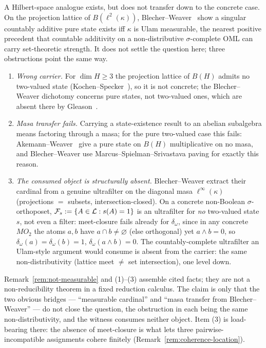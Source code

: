 A Hilbert-space analogue exists, but does not transfer down to the concrete case.
On the projection lattice of $B(\ell^2(\kappa))$, Blecher--Weaver~\cite{BlecherWeaver2017}
show a singular countably additive pure state exists iff $\kappa$ is Ulam
measurable, the nearest positive precedent that countable additivity on a
non-distributive $\sigma$-complete OML can carry set-theoretic strength. It does
not settle the question here; three obstructions point the same way.
\begin{enumerate}[label=\textup{(\arabic*)}]
  \item \emph{Wrong carrier.} For $\dim H\geq 3$ the projection lattice of $B(H)$
    admits no two-valued state (Kochen--Specker~\cite{KochenSpecker1967}), so it
    is not concrete; the Blecher--Weaver dichotomy concerns pure states, not
    two-valued ones, which are absent there by Gleason~\cite{Gleason1957}.
  \item \emph{Masa transfer fails.} Carrying a state-existence result to an
    abelian subalgebra means factoring through a masa; for the pure two-valued
    case this fails: Akemann--Weaver~\cite{AkemannWeaver2008} give a pure state
    on $B(H)$ multiplicative on no masa, and Blecher--Weaver use
    Marcus--Spielman--Srivastava paving for exactly this reason.
  \item \emph{The consumed object is structurally absent.} Blecher--Weaver
    extract their cardinal from a genuine ultrafilter on the diagonal masa
    $\ell^\infty(\kappa)$ (projections $=$ subsets, intersection-closed). On a
    concrete non-Boolean $\sigma$-orthoposet,
    $\mathcal F_s := \{A\in\mathcal{L} : s(A)=1\}$ is an ultrafilter for \emph{no}
    two-valued state $s$, not even a filter: meet-closure fails already for
    $\delta_\omega$, since in any concrete $MO_2$ the atoms $a,b$ have
    $a\cap b\neq\varnothing$ (else orthogonal) yet $a\wedge b = 0$, so
    $\delta_\omega(a)=\delta_\omega(b)=1$, $\delta_\omega(a\wedge b)=0$.
    The countably-complete ultrafilter an Ulam-style argument would consume is
    absent from the carrier: the same non-distributivity (lattice meet $\neq$
    set intersection), one level down.
\end{enumerate}

\begin{remark}\label{rem:no-bridge}
Remark~\ref{rem:not-measurable} and (1)--(3) assemble cited facts; they are not a
non-reducibility theorem in a fixed reduction calculus. The claim is only that
the two obvious bridges --- ``measurable cardinal'' and ``masa transfer from
Blecher--Weaver'' --- do not close the question, the obstruction in each being
the same non-distributivity, and the witness consumes neither object. Item (3) is
load-bearing there: the absence of meet-closure is what lets three
pairwise-incompatible assignments cohere finitely
(Remark~\ref{rem:coherence-location}).
\end{remark}

